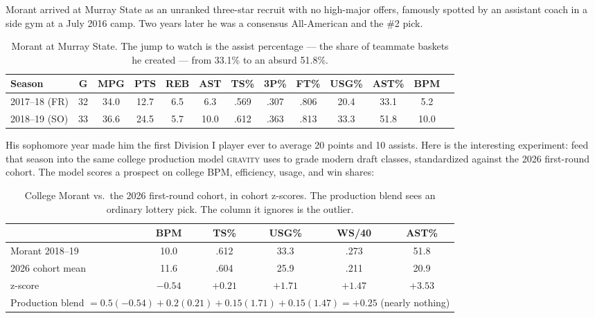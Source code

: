 \documentclass[11pt]{article}
\newcommand{\gravity}{\textsc{gravity}}
\begin{document}
Morant arrived at Murray State as an unranked three-star recruit with no high-major
offers, famously spotted by an assistant coach in a side gym at a July 2016 camp. Two
years later he was a consensus All-American and the \#2 pick.

\begin{table}[h]
\centering\small
\caption{Morant at Murray State. The jump to watch is the assist percentage --- the share
of teammate baskets he created --- from 33.1\% to an absurd 51.8\%.}
\begin{tabular}{lcccccccccccc}
\toprule
Season & G & MPG & PTS & REB & AST & TS\% & 3P\% & FT\% & USG\% & AST\% & BPM \\
\midrule
2017--18 (FR) & 32 & 34.0 & 12.7 & 6.5 & 6.3 & .569 & .307 & .806 & 20.4 & 33.1 & 5.2 \\
2018--19 (SO) & 33 & 36.6 & 24.5 & 5.7 & 10.0 & .612 & .363 & .813 & 33.3 & 51.8 & 10.0 \\
\bottomrule
\end{tabular}
\label{tab:college}
\end{table}

His sophomore year made him the first Division I player ever to average 20 points and 10
assists. Here is the interesting experiment: feed that season into the same college
production model \gravity{} uses to grade modern draft classes, standardized against the
2026 first-round cohort. The model scores a prospect on college BPM, efficiency, usage,
and win shares:

\begin{table}[h]
\centering\small
\caption{College Morant vs.\ the 2026 first-round cohort, in cohort z-scores. The
production blend sees an ordinary lottery pick. The column it ignores is the outlier.}
\begin{tabular}{lccccc}
\toprule
 & BPM & TS\% & USG\% & WS/40 & AST\% \\
\midrule
Morant 2018--19          & 10.0  & .612 & 33.3 & .273 & 51.8 \\
2026 cohort mean         & 11.6  & .604 & 25.9 & .211 & 20.9 \\
z-score                  & $-0.54$ & $+0.21$ & $+1.71$ & $+1.47$ & $\mathbf{+3.53}$ \\
\midrule
\multicolumn{6}{l}{Production blend $= 0.5(-0.54)+0.2(0.21)+0.15(1.71)+0.15(1.47) = \mathbf{+0.25}$
\; (nearly nothing)} \\
\bottomrule
\end{tabular}
\label{tab:prior}
\end{table}
\end{document}
